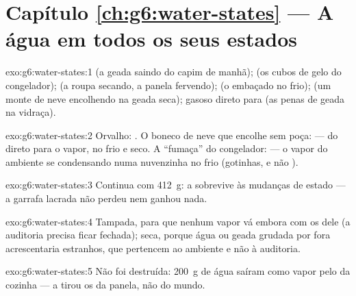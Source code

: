 \section*{Capítulo \ref{ch:g6:water-states} --- A água em todos os seus estados}

\begin{solution}{exo:g6:water-states:1}
 (a geada saindo do capim de manhã);  (os cubos de
gelo do congelador);  (a roupa secando, a panela
fervendo);  (o embaçado no  frio);  (um
monte de neve encolhendo na geada seca); gasoso direto para 
(as penas de geada na vidraça).
\end{solution}

\begin{solution}{exo:g6:water-states:2}
Orvalho: . O boneco de neve que encolhe sem poça:
 --- do  direto para o vapor, no  frio e seco. A
``fumaça'' do congelador:  --- o vapor do ambiente se
condensando numa nuvenzinha no  frio (gotinhas, e não ).
\end{solution}

\begin{solution}{exo:g6:water-states:3}
Continua com \qty{412}{g}: a  sobrevive às mudanças de estado
--- a garrafa lacrada não perdeu nem ganhou nada.
\end{solution}

\begin{solution}{exo:g6:water-states:4}
Tampada, para que nenhum vapor vá embora com os  dele (a
auditoria precisa ficar fechada); seca, porque água ou geada grudada
por fora acrescentaria  estranhos, que pertencem ao ambiente e
não à auditoria.
\end{solution}

\begin{solution}{exo:g6:water-states:5}
Não foi destruída: \qty{200}{g} de água saíram como vapor pelo  da
cozinha --- a  tirou os  da panela, não do mundo.
\end{solution}


